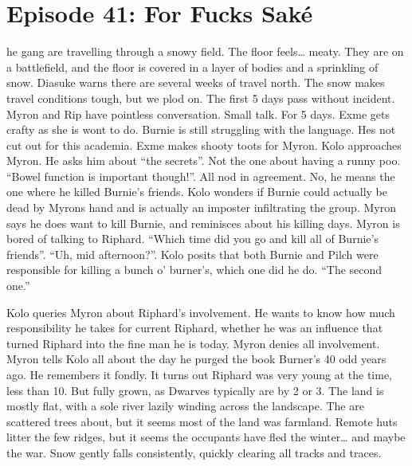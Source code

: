 \section{Episode 41: For Fucks Saké}

\medskip

he gang are travelling through a snowy field. The floor feels… meaty. They are on a battlefield, and the floor is covered in a layer of bodies and a sprinkling of snow. Diasuke warns there are several weeks of travel north. The snow makes travel conditions tough, but we plod on. The first 5 days pass without incident. Myron and Rip have pointless conversation. Small talk. For 5 days. Exme gets crafty as she is wont to do. Burnie is still struggling with the language. Hes not cut out for this academia. Exme makes shooty toots for Myron. Kolo approaches Myron. He asks him about “the secrets”. Not the one about having a runny poo. “Bowel function is important though!”. All nod in agreement. No, he means the one where he killed Burnie’s friends. Kolo wonders if Burnie could actually be dead by Myrons hand and is actually an imposter infiltrating the group. Myron says he does want to kill Burnie, and reminisces about his killing days. Myron is bored of talking to Riphard. “Which time did you go and kill all of Burnie’s friends”. “Uh, mid afternoon?”. Kolo posits that both Burnie and Pilch were responsible for killing a bunch o’ burner’s, which one did he do. “The second one.”\medskip

Kolo queries Myron about Riphard’s involvement. He wants to know how much responsibility he takes for current Riphard, whether he was an influence that turned Riphard into the fine man he is today. Myron denies all involvement. Myron tells Kolo all about the day he purged the book Burner’s 40 odd years ago. He remembers it fondly. It turns out Riphard was very young at the time, less than 10. But fully grown, as Dwarves typically are by 2 or 3. The land is mostly flat, with a sole river lazily winding across the landscape. The are scattered trees about, but it seems most of the land was farmland. Remote huts litter the few ridges, but it seems the occupants have fled the winter… and maybe the war. Snow gently falls consistently, quickly clearing all tracks and traces.\medskip

